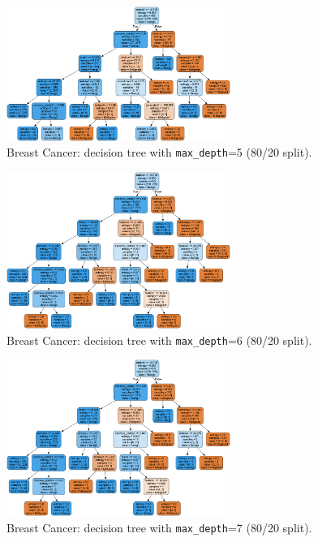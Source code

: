 \begin{figure}[H]
	\centering
	\includegraphics[width=0.65\textwidth]{imgs/dt-mini/dt__breast_cancer__80_vs_20__5.png}
	\caption{Breast Cancer: decision tree with \texttt{max\_depth}=5 (80/20 split).}\label{fig:bc-dt-depth-5}
\end{figure}

\begin{figure}[H]
	\centering
	\includegraphics[width=0.65\textwidth]{imgs/dt-mini/dt__breast_cancer__80_vs_20__6.png}
	\caption{Breast Cancer: decision tree with \texttt{max\_depth}=6 (80/20 split).}\label{fig:bc-dt-depth-6}
\end{figure}

\begin{figure}[H]
	\centering
	\includegraphics[width=0.65\textwidth]{imgs/dt-mini/dt__breast_cancer__80_vs_20__7.png}
	\caption{Breast Cancer: decision tree with \texttt{max\_depth}=7 (80/20 split).}\label{fig:bc-dt-depth-7}
\end{figure}

